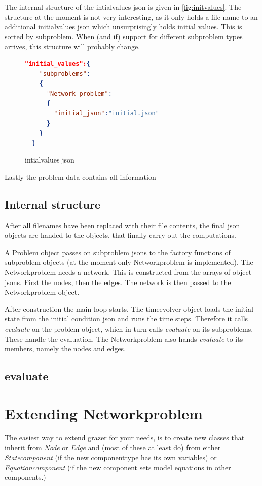 \documentclass[a4paper]{article}
\newcommand{\sco
}{\textunderscore{}}
\begin{document}
The internal structure of the intial\sco values json is given in
\autoref{fig:initvalues}. The structure at the moment is not very interesting,
as it only holds a file name to an additional initialvalues json which
unsurprisingly holds initial values. This is sorted by subproblem. When (and if)
support for different subproblem types arrives, this structure will probably
change.

\begin{figure}[ht]
  \centering
\begin{lstlisting}[language=json,firstnumber=1]
  "initial_values":{
    "subproblems":
    {
      "Network_problem":
      {
        "initial_json":"initial.json"
      }
    }
  }
\end{lstlisting}
  \caption{intialvalues json}
  \label{fig:initvalues}
\end{figure}

Lastly the problem data contains all information


\subsection{Internal structure}
\label{sec:internal-structure}
After all filenames have been replaced with their file contents, the final json
objects are handed to the objects, that finally carry out the computations.

A Problem object passes on subproblem jsons to the factory functions of
subproblem objects (at the moment only Networkproblem is implemented). The
Networkproblem needs a network. This is constructed from the arrays of object
jsons. First the nodes, then the edges. The network is then passed to the
Networkproblem object.


After construction the main loop starts. The timeevolver object loads the
initial state from the initial condition json and runs the time steps. Therefore
it calls \emph{evaluate} on the problem object, which in turn calls
\emph{evaluate} on its subproblems. These handle the evaluation. The
Networkproblem also hands \emph{evaluate} to its members, namely the nodes and
edges.

\subsection*{evaluate}

\section{Extending Networkproblem}
\label{sec:extend-netw}
The easiest way to extend grazer for your needs, is to create new classes that
inherit from \emph{Node} or \emph{Edge} and (most of these at least do) from
either \emph{Statecomponent} (if the new componenttype has its own variables) or
\emph{Equationcomponent} (if the new component sets model equations in other
components.)
\end{document}
